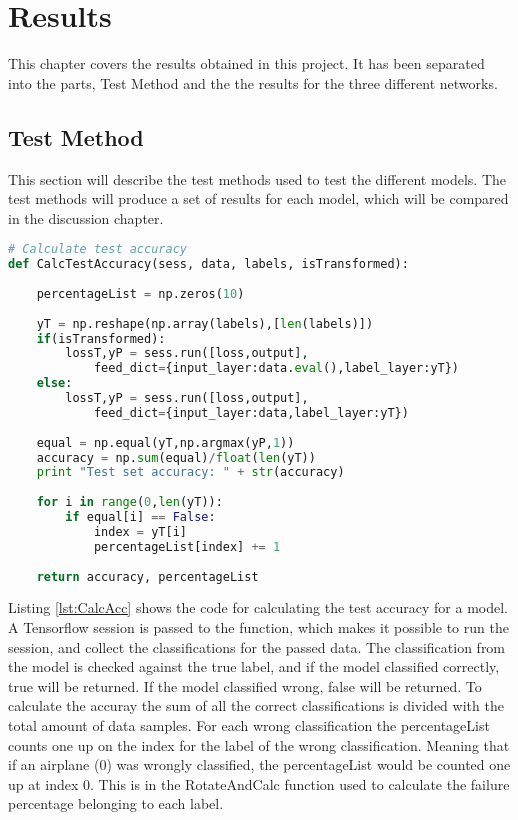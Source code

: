 \chapter{Results}
\label{chp:results}

This chapter covers the results obtained in this project. It has been separated into the parts, Test Method and the the results for the three different networks.

\section{Test Method}

This section will describe the test methods used to test the different models. The test methods will produce a set of results for each model, which will be compared in the discussion chapter.

\begin{lstlisting}[language=Python, label=lst:CalcAcc, caption=Function to calculate the test accuracy for a model]
# Calculate test accuracy
def CalcTestAccuracy(sess, data, labels, isTransformed):
    
    percentageList = np.zeros(10)
    
    yT = np.reshape(np.array(labels),[len(labels)])
    if(isTransformed):
        lossT,yP = sess.run([loss,output],
        	feed_dict={input_layer:data.eval(),label_layer:yT})
    else:
        lossT,yP = sess.run([loss,output],
        	feed_dict={input_layer:data,label_layer:yT})
    
    equal = np.equal(yT,np.argmax(yP,1))
    accuracy = np.sum(equal)/float(len(yT))
    print "Test set accuracy: " + str(accuracy)
    
    for i in range(0,len(yT)):
        if equal[i] == False:
            index = yT[i]
            percentageList[index] += 1
    
    return accuracy, percentageList
\end{lstlisting}

Listing \ref{lst:CalcAcc} shows the code for calculating the test accuracy for a model. A Tensorflow session is passed to the function, which makes it possible to run the session, and collect the classifications for the passed data. The classification from the model is checked against the true label, and if the model classified correctly, true will be returned. If the model classified wrong, false will be returned. To calculate the accuray the sum of all the correct classifications is divided with the total amount of data samples. For each wrong classification the percentageList counts one up on the index for the label of the wrong classification. Meaning that if an airplane (0) was wrongly classified, the percentageList would be counted one up at index 0. This is in the RotateAndCalc function used to calculate the failure percentage belonging to each label.

